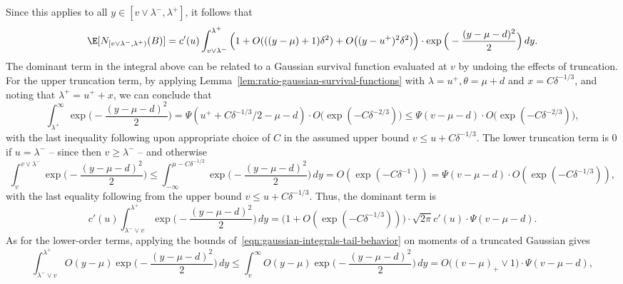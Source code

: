 \documentclass{article}
\begin{document}
	Since this applies to all $y \in [v \vee \lambda^{-}, \lambda^{+}]$, it follows that
	\begin{equation*}
		\E[N_{[v \vee \lambda^{-},\lambda^+)}(B)] = c'(u) \int_{v \vee \lambda^{-}}^{\lambda^+} \Big(1 + O(((y - \mu) + 1) \delta^2) + O\big((y - u^+)^2\delta^2)\Big) \cdot \exp\Big(-\frac{(y - \mu - d)^2}{2}\Big) \,dy.
	\end{equation*}
	The dominant term in the integral above can be related to a Gaussian survival function evaluated at $v$ by undoing the effects of truncation. For the upper truncation term, by applying Lemma~\ref{lem:ratio-gaussian-survival-functions} with $\lambda = u^{+}, \theta = \mu + d$ and $x = C\delta^{-1/3}$, and noting that $\lambda^{+} = u^{+} + x$, we can conclude that
	\begin{equation*}
		\int_{\lambda^{+}}^{\infty} \exp\Big(-\frac{(y - \mu - d)^2}{2}\Big) = \Psi(u^{+} + C\delta^{-1/3}/2 - \mu - d) \cdot O\big(\exp(-C\delta^{-2/3})\big) \leq \Psi(v - \mu - d) \cdot O\big(\exp(-C\delta^{-2/3})\big),
	\end{equation*}
	with the last inequality following upon appropriate choice of $C$ in the assumed upper bound $v \leq u + C\delta^{-1/3}$.  The lower truncation term is $0$ if $u = \lambda^{-}$ -- since then $v \geq \lambda^{-}$ -- and otherwise
	\begin{equation*}
		\int_{v}^{v \vee \lambda^{-}} \exp\Big(-\frac{(y - \mu - d)^2}{2}\Big) \leq \int_{-\infty}^{\mu - C\delta^{-1/2}} \exp\Big(-\frac{(y - \mu - d)^2}{2}\Big) \,dy = O(\exp(-C\delta^{-1})) = \Psi(v - \mu - d) \cdot O(\exp(-C\delta^{-1/3})),
	\end{equation*}
	with the last equality following from the upper bound $v \leq u + C\delta^{-1/3}$. Thus, the dominant term is 
	\begin{equation*}
		c'(u) \int_{\lambda^{-} \vee v}^{\lambda^{+}} \exp\Big(-\frac{(y - \mu - d)^2}{2}\Big) \,dy = \big(1 + O(\exp(-C\delta^{-1/3}))\big) \cdot \sqrt{2\pi} c'(u) \cdot \Psi(v - \mu - d).
	\end{equation*}
	As for the lower-order terms, applying the bounds of~\eqref{eqn:gaussian-integrals-tail-behavior} on moments of a truncated Gaussian gives
	\begin{equation*}
	 \int_{\lambda^{-} \vee v}^{\lambda^{+}} O(y - \mu) \exp\Big(-\frac{(y - \mu - d)^2}{2}\Big) \,dy \leq \int_{v}^{\infty} O(y - \mu) \exp\Big(-\frac{(y - \mu - d)^2}{2}\Big) \,dy = O\big((v - \mu)_{+} \vee 1\big) \cdot \Psi(v - \mu - d),
	\end{equation*}
\end{document}
